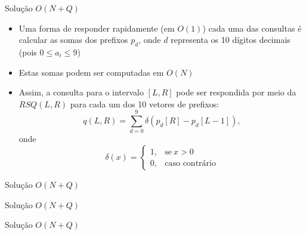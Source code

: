 \begin{frame}[fragile]{Solução $O(N + Q)$}

    \begin{itemize}
        \item Uma forma de responder rapidamente (em $O(1)$) cada uma das consultas é calcular
            as somas dos prefixos $p_d$, onde $d$ representa os 10 dígitos decimais (pois
            $0\leq a_i\leq 9$)

        \item Estas somas podem ser computadas em $O(N)$
        
        \item Assim, a consulta para o intervalo $[L, R]$ pode ser respondida por meio da
            $RSQ(L, R)$ para cada um dos 10 vetores de prefixos:
        \[
            q(L, R) = \sum_{d = 0}^9 \delta(p_d[R] - p_d[L - 1]),
        \]
        onde
        \[
            \delta(x) = \left\{\begin{array}{ll}
                1,& \mbox{se}\ x > 0 \\
                0,& \mbox{caso contrário}
            \end{array}\right.
        \]
   \end{itemize}

\end{frame}

\begin{frame}[fragile]{Solução $O(N + Q)$}
\end{frame}

\begin{frame}[fragile]{Solução $O(N + Q)$}
\end{frame}

\begin{frame}[fragile]{Solução $O(N + Q)$}
\end{frame}
